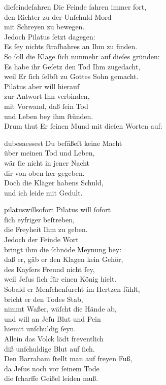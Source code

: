 \documentclass[tocstyle=ref-genre]{ees}
\begin{document}
{\begin{movement}{diefeindefahren}
  Die Feinde fahren immer fort,\\
  den Richter zu der Unſchuld Mord\\
  mit Schreyen zu bewegen.\\
  Jedoch Pilatus ſetzt dagegen:\\
  Es ſey nichts ſtrafbahres an Ihm zu finden.\\
  So ſoll die Klage ſich nunmehr auf dieſes gründen:\\
  Es habe ihr Geſetz den Tod Ihm zugedacht,\\
  weil Er ſich ſelbſt zu Gottes Sohn gemacht.\\
  Pilatus aber will hierauf\\
  zur Antwort Ihn verbinden,\\
  mit Vorwand, daß ſein Tod\\
  und Leben bey ihm ſtünden.\\
  Drum thut Er ſeinen Mund mit dieſen Worten auf:
\end{movement}

\begin{movement}{dubesaessest}
  Du beſäßeſt keine Macht\\
  über meinen Tod und Leben,\\
  wär ſie nicht in jener Nacht\\
  dir von oben her gegeben.\\
  Doch die Kläger habens Schuld,\\
  und ich leide mit Gedult.
\end{movement}

\begin{movement}{pilatuswillsofort}
  Pilatus will ſofort\\
  ſich eyfriger beſtreben,\\
  die Freyheit Ihm zu geben.\\
  Jedoch der Feinde Wort\\
  bringt ihm die ſchnöde Meynung bey:\\
  daß er, gäb er den Klagen kein Gehör,\\
  des Kayſers Freund nicht ſey,\\
  weil Jeſus ſich für einen König hielt.\\
  Sobald er Menſchenfurcht im Hertzen fühlt,\\
  bricht er den Todes Stab,\\
  nimmt Waßer, wäſcht die Hände ab,\\
  und will an Jeſu Blut und Pein\\
  hiemit unſchuldig ſeyn.\\
  Allein das Volck lädt freventlich\\
  diß unſchuldige Blut auf ſich.\\
  Den Barrabam ſtellt man auf freyen Fuß,\\
  da Jeſus noch vor ſeinem Tode\\
  die ſcharffe Geißel leiden muß.
\end{movement}

}
\end{document}
